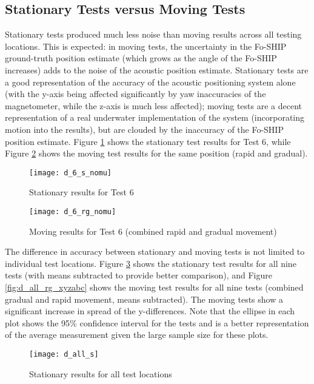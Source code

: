 \documentclass[12pt,a4paper]{report}
\begin{document}
\subsection{Stationary Tests versus Moving Tests} \label{ssec:6s2s3}
Stationary tests produced much less noise than moving results across all testing locations. This is expected: in moving tests, the uncertainty in the Fo-SHIP ground-truth position estimate (which grows as the angle of the Fo-SHIP increases) adds to the noise of the acoustic position estimate. Stationary tests are a good representation of the accuracy of the acoustic positioning system alone (with the y-axis being affected significantly by yaw inaccuracies of the magnetometer, while the z-axis is much less affected); moving tests are a decent representation of a real underwater implementation of the system (incorporating motion into the results), but are clouded by the inaccuracy of the Fo-SHIP position estimate. Figure \ref{fig:d_6_s_nomu} shows the stationary test results for Test 6, while Figure \ref{fig:d_6_rg_nomu} shows the moving test results for the same position (rapid and gradual).

\begin{figure}[htbp]
	\centering
	\texttt{[image: d\_6\_s\_nomu]}
	\caption{Stationary results for Test 6}
	\label{fig:d_6_s_nomu}
\end{figure}

\begin{figure}[htbp]
	\centering
	\texttt{[image: d\_6\_rg\_nomu]}
	\caption{Moving results for Test 6 (combined rapid and gradual movement)}
	\label{fig:d_6_rg_nomu}
\end{figure}

The difference in accuracy between stationary and moving tests is not limited to individual test locations. Figure \ref{fig:d_all_s} shows the stationary test results for all nine tests (with means subtracted to provide better comparison), and Figure \ref{fig:d_all_rg_xyzabc} shows the moving test results for all nine tests (combined gradual and rapid movement, means subtracted). The moving tests show a significant increase in spread of the y-differences. Note that the ellipse in each plot shows the 95\% confidence interval for the tests and is a better representation of the average measurement given the large sample size for these plots.


\begin{figure}[htbp]
	\centering
	\texttt{[image: d\_all\_s]}
	\caption{Stationary results for all test locations}
	\label{fig:d_all_s}
\end{figure}
\end{document}
